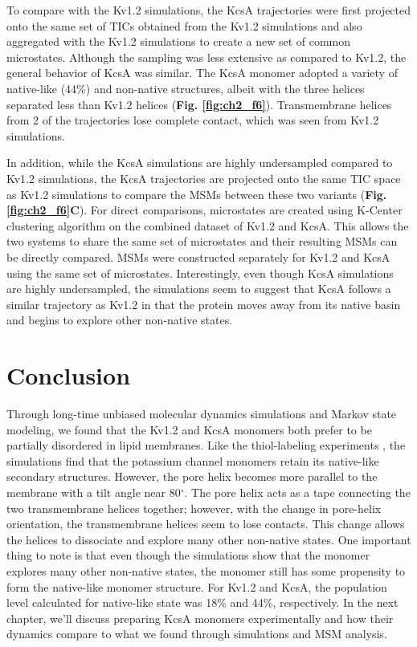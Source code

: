 To compare with the Kv1.2 simulations, the KcsA trajectories were first projected onto the same set of TICs obtained from the Kv1.2 simulations and also aggregated with the Kv1.2 simulations to create a new set of common microstates. Although the sampling was less extensive as compared to Kv1.2, the general behavior of KcsA was similar. The KcsA monomer adopted a variety of native-like (44\%) and non-native structures, albeit with the three helices separated less than Kv1.2 helices (\textbf{Fig. \ref{fig:ch2_f6}}). Transmembrane helices from 2 of the trajectories lose complete contact, which was seen from Kv1.2 simulations.

In addition, while the KcsA simulations are highly undersampled compared to Kv1.2 simulations, the KcsA trajectories are projected onto the same TIC space as Kv1.2 simulations to compare the MSMs between these two variants (\textbf{Fig. \ref{fig:ch2_f6}C}). For direct comparisons, microstates are created using K-Center clustering algorithm on the combined dataset of Kv1.2 and KcsA. This allows the two systems to share the same set of microstates and their resulting MSMs can be directly compared. MSMs were constructed separately for Kv1.2 and KcsA using the same set of microstates. Interestingly, even though KcsA simulations are highly undersampled, the simulations seem to suggest that KcsA follows a similar trajectory as Kv1.2 in that the protein moves away from its native basin and begins to explore other non-native states.

\section{Conclusion}
Through long-time unbiased molecular dynamics simulations and Markov state modeling, we found that the Kv1.2 and KcsA monomers both prefer to be partially disordered in lipid membranes. Like the thiol-labeling experiments \citep{delaney2014}, the simulations find that the potassium channel monomers retain its native-like secondary structures. However, the pore helix becomes more parallel to the membrane with a tilt angle near 80$^{\circ}$. The pore helix acts as a tape connecting the two transmembrane helices together; however, with the change in pore-helix orientation, the transmembrane helices seem to lose contacts. This change allows the helices to dissociate and explore many other non-native states. One important thing to note is that even though the simulations show that the monomer explores many other non-native states, the monomer still has some propensity to form the native-like monomer structure. For Kv1.2 and KcsA, the population level calculated for native-like state was 18\% and 44\%, respectively. In the next chapter, we'll discuss preparing KcsA monomers experimentally and how their dynamics compare to what we found through simulations and MSM analysis.

\renewcommand\thefigure{\thechapter.\arabic{figure}} 


